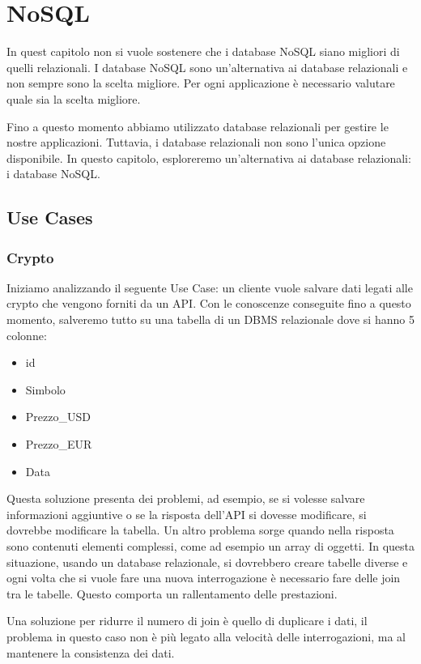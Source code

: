 \chapter{NoSQL}
\begin{nota}
      In quest capitolo non si vuole sostenere che i database NoSQL siano
      migliori di quelli relazionali. I database NoSQL sono un'alternativa
      ai database relazionali e non sempre sono la scelta migliore. Per ogni
      applicazione è necessario valutare quale sia la scelta migliore.
\end{nota}
Fino a questo momento abbiamo utilizzato database relazionali per gestire le
nostre applicazioni. Tuttavia, i database relazionali non sono l'unica
opzione disponibile. In questo capitolo, esploreremo un'alternativa ai
database relazionali: i database NoSQL.
\section*{Use Cases}
\subsection*{Crypto}
Iniziamo analizzando il seguente Use Case: un cliente vuole salvare dati legati 
alle crypto che vengono forniti da un API. Con le conoscenze conseguite fino a 
questo momento, salveremo tutto su una tabella di un DBMS relazionale dove si 
hanno 5 colonne:
\begin{itemize}
      \item id
      \item Simbolo
      \item Prezzo\_USD
      \item Prezzo\_EUR
      \item Data
\end{itemize}
Questa soluzione presenta dei problemi, ad esempio, se si volesse salvare
informazioni aggiuntive o se la risposta dell'API si dovesse modificare, si
dovrebbe modificare la tabella. Un altro problema sorge quando nella risposta 
sono contenuti elementi complessi, come ad esempio un array di oggetti. In questa 
situazione, usando un database relazionale, si dovrebbero creare tabelle diverse 
e ogni volta che si vuole fare una nuova interrogazione è necessario fare delle 
join tra le tabelle. Questo comporta un rallentamento delle prestazioni.

Una soluzione per ridurre il numero di join è quello di duplicare i dati, il
problema in questo caso non è più legato alla velocità delle interrogazioni, ma
al mantenere la consistenza dei dati. 

